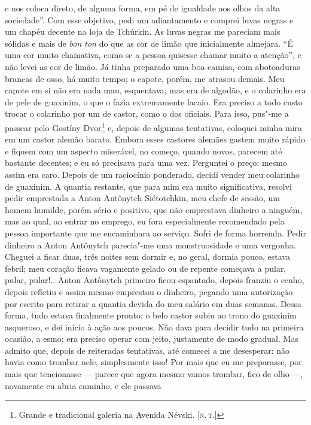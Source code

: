 e nos coloca direto, de alguma forma, em pé de igualdade aos olhos da
alta sociedade''. Com esse objetivo, pedi um adiantamento e comprei
luvas negras e um chapéu decente na loja de Tchúrkin. As luvas negras me
pareciam mais sólidas e mais de \emph{bon ton} do que as cor de limão
que inicialmente almejara. ``É uma cor muito chamativa, como se a pessoa
quisesse chamar muito a atenção'', e não levei as cor de limão. Já tinha
preparado uma boa camisa, com abotoaduras brancas de osso, há muito
tempo; o capote, porém, me atrasou demais. Meu capote em si não era nada
mau, esquentava; mas era de algodão, e o colarinho era de pele de
guaxinim, o que o fazia extremamente lacaio. Era preciso a todo custo
trocar o colarinho por um de castor, como o dos oficiais. Para isso,
pus"-me a passear pelo Gostíny Dvor\footnote{Grande e tradicional galeria
  na Avenida Névski. {[}\textsc{n.\,t.}{]}} e, depois de algumas tentativas,
coloquei minha mira em um castor alemão barato. Embora esses castores
alemães gastem muito rápido e fiquem com um aspecto miserável, no
começo, quando novos, parecem até bastante decentes; e eu só precisava
para uma vez. Perguntei o preço: mesmo assim era caro. Depois de um
raciocínio ponderado, decidi vender meu colarinho de guaxinim. A quantia
restante, que para mim era muito significativa, resolvi pedir emprestada
a Anton Antônytch Siétotchkin, meu chefe de sessão, um homem humilde,
porém sério e positivo, que não emprestava dinheiro a ninguém, mas ao
qual, ao entrar no emprego, eu fora especialmente recomendado pela
pessoa importante que me encaminhara ao serviço. Sofri de forma
horrenda. Pedir dinheiro a Anton Antônytch parecia"-me uma monstruosidade
e uma vergonha. Cheguei a ficar duas, três noites sem dormir e, no
geral, dormia pouco, estava febril; meu coração ficava vagamente gelado
ou de repente começava a pular, pular, pular!.. Anton Antônytch primeiro
ficou espantado, depois franziu o cenho, depois refletiu e assim mesmo
emprestou o dinheiro, pegando uma autorização por escrito para retirar a
quantia devida do meu salário em duas semanas. Dessa forma, tudo estava
finalmente pronto; o belo castor subiu ao trono do guaxinim asqueroso, e
dei início à ação aos poucos. Não dava para decidir tudo na primeira
ocasião, a esmo; era preciso operar com jeito, justamente de modo
gradual. Mas admito que, depois de reiteradas tentativas, até comecei a
me desesperar: não havia como trombar nele, simplesmente isso! Por mais
que eu me preparasse, por mais que tencionasse --- parece que agora mesmo
vamos trombar, fico de olho ---, novamente eu abria caminho, e ele passava
